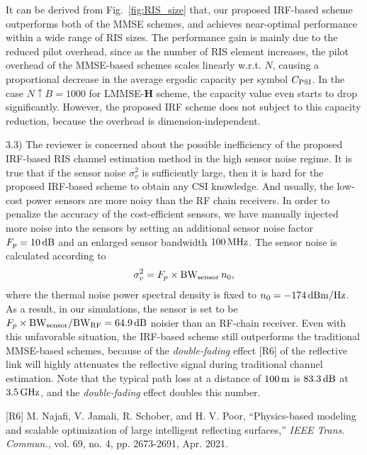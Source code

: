 \documentclass[a4paper,12pt]{article}
\begin{document}
{{It can be derived from {Fig.~\ref{fig:RIS_size}} that, our proposed IRF-based scheme outperforms both of the MMSE schemes, and achieves near-optimal performance within a wide range of RIS sizes. The performance gain is mainly due to the reduced pilot overhead, since as the number of RIS element increases, the pilot overhead of the MMSE-based schemes scales linearly w.r.t. $N$, causing a proportional decrease in the average ergodic capacity per symbol $C_{\rm PSI}$. In the case $N\uparrow B=1000$ for LMMSE-$\bm H$ scheme, the capacity value even starts to drop significantly. However, the proposed IRF scheme does not subject to this capacity reduction, because the overhead is dimension-independent.  


3.3) The reviewer is concerned about the possible inefficiency of the proposed IRF-based RIS channel estimation method in the high sensor noise regime. It is true that if the sensor noise $\sigma_v^2$ is sufficiently large, then it is hard for the proposed IRF-based scheme to obtain any CSI knowledge. And usually, the low-cost power sensors are more noisy than the RF chain receivers. In order to penalize the accuracy of the cost-efficient sensors, we have manually injected more noise into the sensors by setting an additional sensor noise factor $F_p=10\,{\rm dB}$ and an enlarged sensor bandwidth $100\,{\rm MHz}$. The sensor noise is calculated according to 
\begin{equation*}
    \sigma_v^2 = F_p \times {\rm BW}_{\rm sensor}\, n_0,
\end{equation*}
where the thermal noise power spectral density is fixed to $n_0 =-174\,{\rm dBm/Hz}$. As a result, in our simulations, the sensor is set to be $F_p \times {\rm BW}_{\rm sensor}/{\rm BW}_{\rm RF} = 64.9\,{\rm dB}$ noisier than an RF-chain receiver. Even with this unfavorable situation, the IRF-based scheme still outperforms the traditional MMSE-based schemes, because of the {\it double-fading} effect [R6] of the reflective link will highly attenuates the reflective signal during traditional channel estimation. Note that the typical path loss at a distance of $100\,{\rm m}$ is $83.3\,{\rm dB}$ at $3.5\,{\rm GHz}$, and the {\it double-fading} effect doubles this number. 

[R6] M. Najafi, V. Jamali, R. Schober, and H. V. Poor, ``Physics-based modeling and scalable optimization of large intelligent reflecting surfaces,'' {\it IEEE Trans. Commun.}, vol. 69, no. 4, pp. 2673-2691, Apr. 2021.

}}
\end{document}
